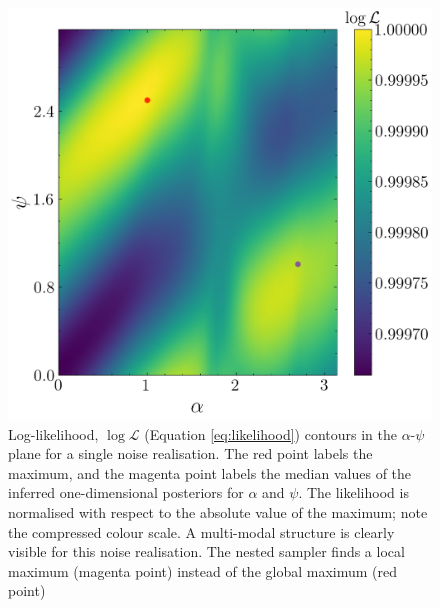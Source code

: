 \documentclass[fleqn,usenatbib,useAMS]{mnras}
\begin{document}
\begin{figure}
	\centering
	\includegraphics[width=\columnwidth]{images/likelihood_surface_alpha_psi}
	\caption{Log-likelihood, $\log \mathcal{L}$ (Equation \ref{eq:likelihood}) contours in the $\alpha$-$\psi$ plane for a single noise realisation.  The red point labels the maximum, and the magenta point labels the median values of the inferred one-dimensional posteriors for $\alpha$ and $\psi$. The likelihood is normalised with respect to the absolute value of the maximum; note the compressed colour scale. A multi-modal structure is clearly visible for this noise realisation.  The nested sampler finds a local maximum (magenta point) instead of the global maximum (red point)}
	\label{fig:likelihood_surface_alpha_psi}
\end{figure}

















\end{document}
